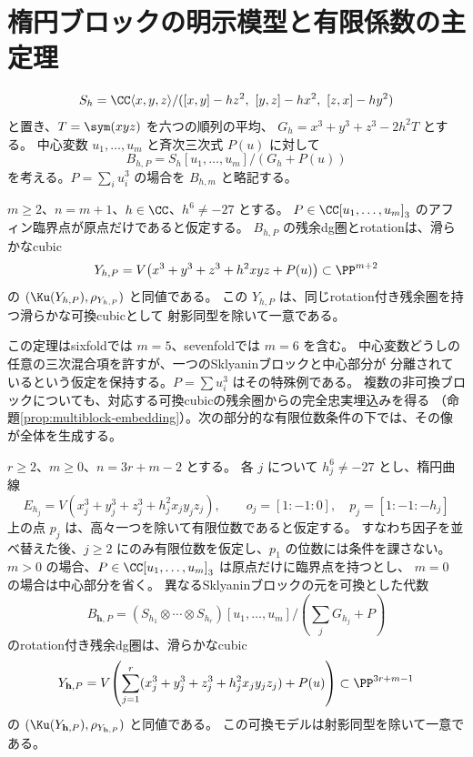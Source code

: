 \section{楕円ブロックの明示模型と有限係数の主定理}\label{sec:explicit-block-results}

\[
 S_h=\CC\langle x,y,z\rangle/
 ([x,y]-hz^2,\ [y,z]-hx^2,\ [z,x]-hy^2)
\]
と置き、\(T=\sym(xyz)\) を六つの順列の平均、
\(G_h=x^3+y^3+z^3-2h^2T\) とする。
中心変数 \(u_1,\ldots,u_m\) と斉次三次式 \(P(u)\) に対して
\[
 B_{h,P}=S_h[u_1,\ldots,u_m]/(G_h+P(u))
\]
を考える。\(P=\sum_i u_i^3\) の場合を \(B_{h,m}\) と略記する。

\begin{theorem}[一ブロックと任意の中心三次式の可換モデル]\label{thm:global}
 \(m\ge2\)、\(n=m+1\)、\(h\in\CC\)、\(h^6\ne-27\) とする。
 \(P\in\CC[u_1,\ldots,u_m]_3\) のアフィン臨界点が原点だけであると仮定する。
 \(B_{h,P}\) の残余dg圏とrotationは、滑らかなcubic
 \[
 Y_{h,P}=V\!\left(x^3+y^3+z^3+h^2xyz+P(u)\right)
 \subset\PP^{m+2}
 \]
 の \((\Ku(Y_{h,P}),\rho_{Y_{h,P}})\) と同値である。
 この \(Y_{h,P}\) は、同じrotation付き残余圏を持つ滑らかな可換cubicとして
 射影同型を除いて一意である。
\end{theorem}

この定理はsixfoldでは \(m=5\)、sevenfoldでは \(m=6\) を含む。
中心変数どうしの任意の三次混合項を許すが、一つのSklyaninブロックと中心部分が
分離されているという仮定を保持する。\(P=\sum u_i^3\) はその特殊例である。
複数の非可換ブロックについても、対応する可換cubicの残余圏からの完全忠実埋込みを得る
（命題\ref{prop:multiblock-embedding}）。次の部分的な有限位数条件の下では、その像が全体を生成する。

\begin{theorem}[一つの任意位数ブロックを許す多ブロック可換モデル]\label{thm:multiblock-model}
 \(r\ge2\)、\(m\ge0\)、\(n=3r+m-2\) とする。
 各 \(j\) について \(h_j^6\ne-27\) とし、楕円曲線
 \[
 E_{h_j}=V(x_j^3+y_j^3+z_j^3+h_j^2x_jy_jz_j),\qquad
 o_j=[1:-1:0],\quad p_j=[1:-1:-h_j]
 \]
 上の点 \(p_j\) は、高々一つを除いて有限位数であると仮定する。
 すなわち因子を並べ替えた後、\(j\ge2\) にのみ有限位数を仮定し、\(p_1\) の位数には条件を課さない。
 \(m>0\) の場合、\(P\in\CC[u_1,\ldots,u_m]_3\) は原点だけに臨界点を持つとし、
 \(m=0\) の場合は中心部分を省く。
 異なるSklyaninブロックの元を可換とした代数
 \[
 B_{\mathbf h,P}=
 (S_{h_1}\otimes\cdots\otimes S_{h_r})[u_1,\ldots,u_m]
 \big/\left(\sum_jG_{h_j}+P\right)
 \]
 のrotation付き残余dg圏は、滑らかなcubic
 \[
 Y_{\mathbf h,P}=V\!\left(
 \sum_{j=1}^r(x_j^3+y_j^3+z_j^3+h_j^2x_jy_jz_j)+P(u)
 \right)\subset\PP^{3r+m-1}
 \]
 の \((\Ku(Y_{\mathbf h,P}),\rho_{Y_{\mathbf h,P}})\) と同値である。
 この可換モデルは射影同型を除いて一意である。
\end{theorem}

